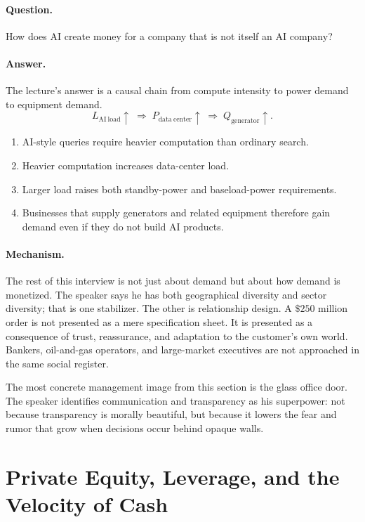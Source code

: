 \paragraph{Question.} How does AI create money for a company that is not itself an AI company?

\paragraph{Answer.} The lecture's answer is a causal chain from compute intensity to power demand to equipment demand.
\begin{equation}
L_{\mathrm{AI\ load}}\uparrow \;\Rightarrow\; P_{\mathrm{data\ center}}\uparrow \;\Rightarrow\; Q_{\mathrm{generator}}\uparrow.
\end{equation}

\begin{enumerate}
\item AI-style queries require heavier computation than ordinary search.
\item Heavier computation increases data-center load.
\item Larger load raises both standby-power and baseload-power requirements.
\item Businesses that supply generators and related equipment therefore gain demand even if they do not build AI products.
\end{enumerate}

\paragraph{Mechanism.} The rest of this interview is not just about demand but about how demand is monetized. The speaker says he has both geographical diversity and sector diversity; that is one stabilizer. The other is relationship design. A \(\$250\) million order is not presented as a mere specification sheet. It is presented as a consequence of trust, reassurance, and adaptation to the customer's own world. Bankers, oil-and-gas operators, and large-market executives are not approached in the same social register.

The most concrete management image from this section is the glass office door. The speaker identifies communication and transparency as his superpower: not because transparency is morally beautiful, but because it lowers the fear and rumor that grow when decisions occur behind opaque walls.

\section{Private Equity, Leverage, and the Velocity of Cash}

